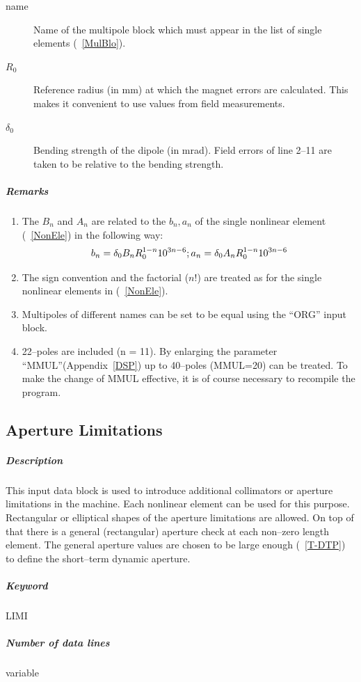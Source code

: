 \begin{description}
\item [name] Name of the multipole block which must appear in the list
  of single elements (~\ref{MulBlo}).
\item [$ R_{0} $] Reference radius (in mm) at which the magnet errors
  are calculated.  This makes it convenient to use values from field
  measurements.
\item [$ \delta_{0} $] Bending strength of the dipole (in mrad). Field
  errors of line 2--11 are taken to be relative to the bending
  strength.
\end{description}

\subparagraph{Remarks}
\begin{enumerate}
\item The $ B_{n} $ and $ A_{n} $ are related to the $ b_{n}, a_{n} $
  of the single nonlinear element (~\ref{NonEle}) in the following
  way:
  $$
  b_{n} = \delta_{0} B_{n} R_{0}^{1-n} 10^{3n-6}; \\
  a_{n} = \delta_{0} A_{n} R_{0}^{1-n} 10^{3n-6}
  $$
\item The sign convention and the factorial ($n$!) are treated as for
  the single nonlinear elements in (~\ref{NonEle}).
\item Multipoles of different names can be set to be equal using the
  ``ORG'' input block.
\item 22--poles are included (n = 11). By enlarging the parameter
  ``MMUL''(Appendix~\ref{DSP}) up to 40--poles (MMUL=20) can be
  treated. To make the change of MMUL effective, it is of course
  necessary to recompile the program.
\end{enumerate}

\subsection{Aperture Limitations} \label{ApeLim}

\subparagraph{Description} This input data block is used to introduce
additional collimators or aperture limitations in the machine.  Each
nonlinear element can be used for this purpose. Rectangular or
elliptical shapes of the aperture limitations are allowed. On top of
that there is a general (rectangular) aperture check at each non--zero
length element. The general aperture values are chosen to be large
enough (~\ref{T-DTP}) to define the short--term dynamic aperture.

\subparagraph{Keyword} LIMI \subparagraph{Number of data lines}
variable

